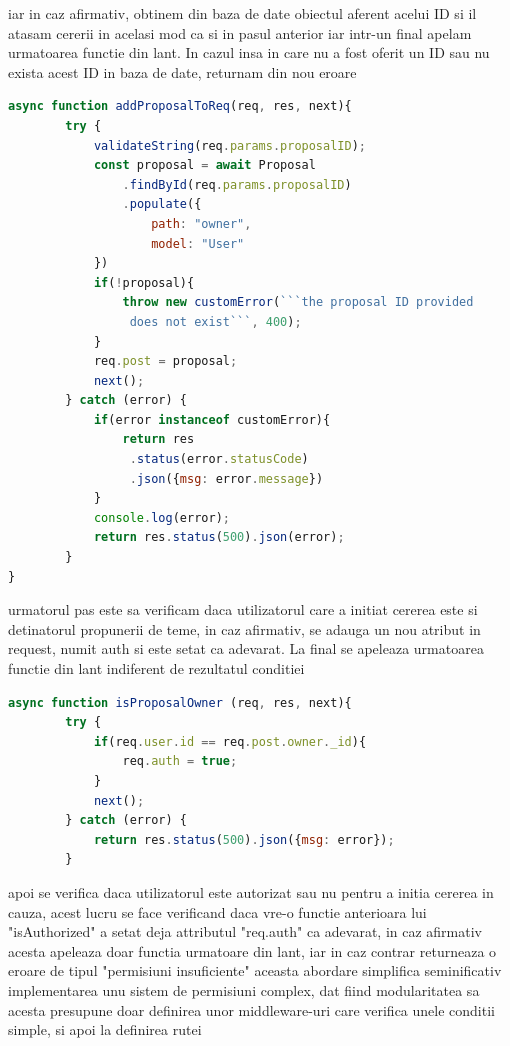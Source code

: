 \documentclass[12pt,a4paper,hidelinks]{report}
\theoremstyle{definition}
\theoremstyle{remark}
\begin{document}
    iar in caz afirmativ, obtinem din baza de date obiectul aferent acelui ID si il atasam cererii in acelasi mod ca si in pasul anterior 
    iar intr-un final apelam urmatoarea functie din lant. In cazul insa in care nu a fost oferit un ID sau nu exista acest ID in baza de date, returnam din nou eroare
    \begin{lstlisting}[language=Javascript]
    async function addProposalToReq(req, res, next){
        try {
            validateString(req.params.proposalID);
            const proposal = await Proposal
                .findById(req.params.proposalID)
                .populate({
                    path: "owner",
                    model: "User"
            })
            if(!proposal){
                throw new customError(```the proposal ID provided
                 does not exist```, 400);
            }
            req.post = proposal;
            next();
        } catch (error) {
            if(error instanceof customError){
                return res
                 .status(error.statusCode)
                 .json({msg: error.message})
            }
            console.log(error);
            return res.status(500).json(error);   
        }
}
    \end{lstlisting}
    urmatorul pas este sa verificam daca utilizatorul care a initiat cererea este si detinatorul propunerii de teme,
    in caz afirmativ, se adauga un nou atribut in request, numit auth si este setat ca adevarat.
    La final se apeleaza urmatoarea functie din lant indiferent de rezultatul conditiei
    \begin{lstlisting}[language=Javascript]
        async function isProposalOwner (req, res, next){
        try {
            if(req.user.id == req.post.owner._id){
                req.auth = true;
            }
            next();
        } catch (error) {
            return res.status(500).json({msg: error});
        }
    \end{lstlisting}
    apoi se verifica daca utilizatorul este autorizat sau nu pentru a initia cererea in cauza, acest lucru se face verificand
    daca vre-o functie anterioara lui "isAuthorized" a setat deja attributul "req.auth" ca adevarat, in caz afirmativ
    acesta apeleaza doar functia urmatoare din lant, iar in caz contrar returneaza o eroare de tipul "permisiuni insuficiente"
    aceasta abordare simplifica seminificativ implementarea unu sistem de permisiuni complex, dat fiind modularitatea sa
    acesta presupune doar definirea unor middleware-uri care verifica unele conditii simple, si apoi la definirea rutei
\end{document}
